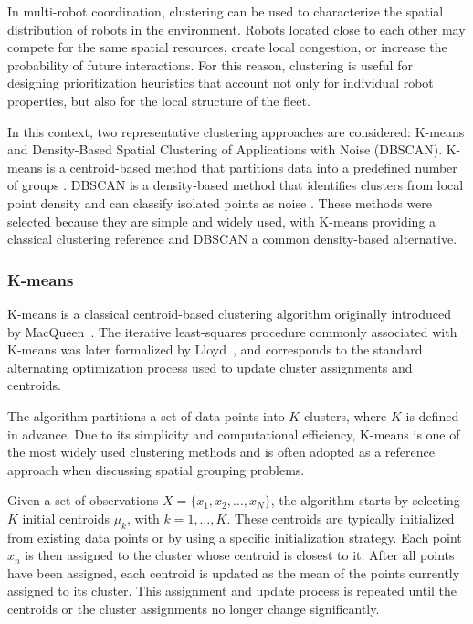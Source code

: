 In multi-robot coordination, clustering can be used to characterize the spatial distribution of
robots in the environment. Robots located close to each other may compete for the same spatial
resources, create local congestion, or increase the probability of future interactions. For this
reason, clustering is useful for designing prioritization heuristics that account not only for
individual robot properties, but also for the local structure of the fleet.

In this context, two representative clustering approaches are considered: K-means and Density-Based
Spatial Clustering of Applications with Noise (DBSCAN). K-means is a centroid-based method that
partitions data into a predefined number of groups \cite{macqueen1967kmeans,lloyd1982least}.
DBSCAN is a density-based method that identifies clusters from local point density and can classify
isolated points as noise \cite{ester1996dbscan}. These methods were selected because they are
simple and widely used, with K-means providing a classical clustering reference and DBSCAN a
common density-based alternative.

\subsubsection{K-means}
\label{subsubsec:kmeans}
\hspace{\parindent}
K-means is a classical centroid-based clustering algorithm originally introduced by MacQueen~\cite{macqueen1967kmeans}. The iterative least-squares procedure commonly associated with K-means was later formalized by Lloyd~\cite{lloyd1982least}, and corresponds to the standard alternating optimization process used to update cluster assignments and centroids.

The algorithm partitions a set of data points into \(K\) clusters, where \(K\) is defined in advance. Due to its simplicity and computational efficiency, K-means is one of the most widely used clustering methods and is often adopted as a reference approach when discussing spatial grouping problems.

Given a set of observations \(X = \{x_1, x_2, \ldots, x_N\}\), the algorithm starts by selecting \(K\) initial centroids \(\mu_k\), with \(k = 1,\ldots,K\). These centroids are typically initialized from existing data points or by using a specific initialization strategy. Each point \(x_n\) is then assigned to the cluster whose centroid is closest to it. After all points have been assigned, each centroid is updated as the mean of the points currently assigned to its cluster. This assignment and update process is repeated until the centroids or the cluster assignments no longer change significantly. 

